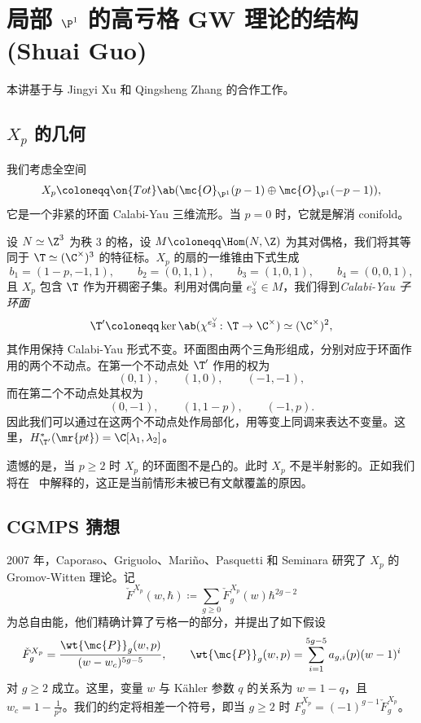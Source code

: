 \section{\texorpdfstring{局部 \(\P^1\) 的高亏格 GW 理论的结构}{局部 P1 的高亏格 GW 理论的结构} (Shuai Guo)}%
\label{sec:Structure of higher-genus GW theory of local P1 (Shuai Guo)}

本讲基于与 Jingyi Xu 和 Qingsheng Zhang 的合作工作。

\subsection{\(X_p\) 的几何}%
\label{sub:The geometry of Xp}

我们考虑全空间
\[ X_p \coloneqq \on{Tot}\ab(\mc{O}_{\P^1}(p-1) \oplus \mc{O}_{\P^1}(-p-1)), \]
它是一个非紧的环面 Calabi-Yau 三维流形。当 \(p = 0\) 时，它就是解消 conifold。

设 \(N \simeq \Z^3\) 为秩 \(3\) 的格，设 \(M \coloneqq \Hom(N,\Z)\) 为其对偶格，我们将其等同于 \(\T \simeq (\C^{\times})^3\) 的特征标。\(X_p\) 的扇的一维锥由下式生成
\[ b_1 = (1-p,-1,1), \qquad b_2 = (0,1,1), \qquad b_3 = (1,0,1), \qquad b_4 = (0,0,1), \]
且 \(X_p\) 包含 \(\T\) 作为开稠密子集。利用对偶向量 \(e_3^{\vee} \in M\)，我们得到\textit{Calabi-Yau 子环面}
\[ \T' \coloneqq \ker\ab(\chi^{e_3^{\vee}} \colon \T \to \C^{\times}) \simeq (\C^{\times})^2, \]
其作用保持 Calabi-Yau 形式不变。环面图由两个三角形组成，分别对应于环面作用的两个不动点。在第一个不动点处 \(\T'\) 作用的权为
\[ (0,1), \qquad (1,0), \qquad (-1,-1), \]
而在第二个不动点处其权为
\[ (0,-1), \qquad (1,1-p), \qquad (-1,p). \]
因此我们可以通过在这两个不动点处作局部化，用等变上同调来表达不变量。这里，\(H^*_{\T'}(\mr{pt}) = \C[\lambda_1,\lambda_2]\)。

遗憾的是，当 \(p \geq 2\) 时 \(X_p\) 的环面图不是凸的。此时 \(X_p\) 不是半射影的。正如我们将在~ 中解释的，这正是当前情形未被已有文献覆盖的原因。

\subsection{CGMPS 猜想}%
\label{sub:The conjecture of CGMPS}

2007 年，Caporaso、Griguolo、Mari\~{n}o、Pasquetti 和 Seminara 研究了 \(X_p\) 的 Gromov-Witten 理论。记
\[ \check{F}^{X_p}(w,\hbar) \coloneqq \sum_{g \geq 0} \check{F}_g^{X_p}(w) \hbar^{2g-2} \]
为总自由能，他们精确计算了亏格一的部分，并提出了如下假设
\begin{equation}\label{eqn:cgmps ansatz}
    \check{F}_g^{X_p} = \frac{\wt{\mc{P}}_g(w,p)}{(w-w_c)^{5g-5}}, \qquad \wt{\mc{P}}_g(w,p) = \sum_{i=1}^{5g-5} a_{g,i}(p)(w-1)^i
\end{equation}
对 \(g \geq 2\) 成立。这里，变量 \(w\) 与 K\"ahler 参数 \(q\) 的关系为 \(w = 1-q\)，且 \(w_c = 1 - \frac{1}{p^2}\)。我们的约定将相差一个符号，即当 \(g \geq 2\) 时 \(F_g^{X_p} = (-1)^{g-1}\check{F}_g^{X_p}\)。

